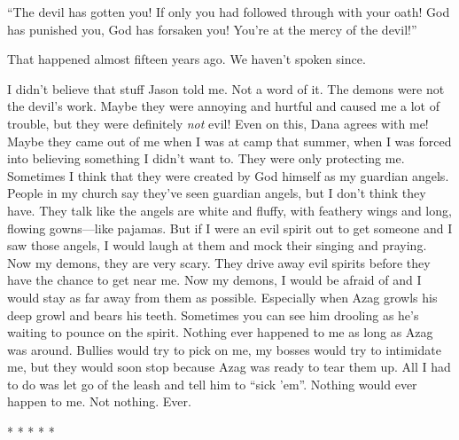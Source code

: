 \documentclass[
]{article}
\begin{document}
``The devil has gotten you! If only you had followed through with your
oath! God has punished you, God has forsaken you! You're at the mercy of
the devil!''

That happened almost fifteen years ago. We haven't spoken since.

I didn't believe that stuff Jason told me. Not a word of it. The demons
were not the devil's work. Maybe they were annoying and hurtful and
caused me a lot of trouble, but they were definitely \emph{not} evil!
Even on this, Dana agrees with me! Maybe they came out of me when I was
at camp that summer, when I was forced into believing something I didn't
want to. They were only protecting me. Sometimes I think that they were
created by God himself as my guardian angels. People in my church say
they've seen guardian angels, but I don't think they have. They talk
like the angels are white and fluffy, with feathery wings and long,
flowing gowns---like pajamas. But if I were an evil spirit out to get
someone and I saw those angels, I would laugh at them and mock their
singing and praying. Now my demons, they are very scary. They drive away
evil spirits before they have the chance to get near me. Now my demons,
I would be afraid of and I would stay as far away from them as possible.
Especially when Azag growls his deep growl and bears his teeth.
Sometimes you can see him drooling as he's waiting to pounce on the
spirit. Nothing ever happened to me as long as Azag was around. Bullies
would try to pick on me, my bosses would try to intimidate me, but they
would soon stop because Azag was ready to tear them up. All I had to do
was let go of the leash and tell him to ``sick 'em''. Nothing would ever
happen to me. Not nothing. Ever.

* * * * *
\end{document}
